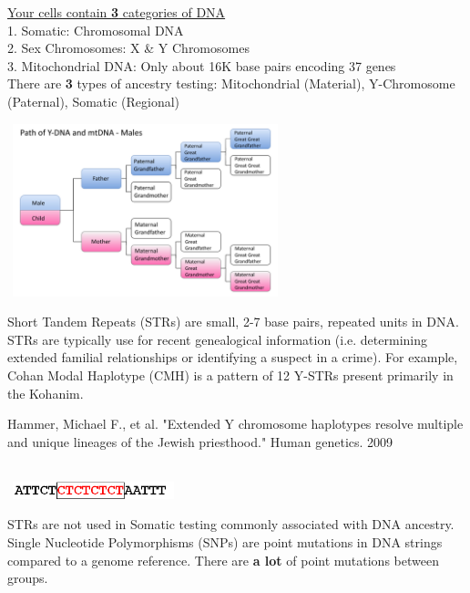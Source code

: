 \documentclass[hyperref,openany, oneside]{labbook} %
\begin{document}
\vspace{-0.4cm}

\vspace{-0.3cm}
\underline{Your cells contain \textbf{3} categories of DNA} \\
1. Somatic: Chromosomal DNA \\
2. Sex Chromosomes: X \& Y Chromosomes \\
3. Mitochondrial DNA: Only about 16K base pairs encoding 37 genes \\


There are \textbf{3} types of ancestry testing: Mitochondrial (Material), Y-Chromosome (Paternal), Somatic (Regional)
\begin{center}
	\includegraphics[height=5cm, width=8cm]{Paths.png}
\end{center}

Short Tandem Repeats (STRs) are small, 2-7 base pairs, repeated units in DNA. STRs are typically use for recent genealogical information (i.e. determining extended familial relationships or identifying a suspect in a crime). For example, Cohan Modal Haplotype (CMH) is a pattern of 12 Y-STRs present primarily in the Kohanim.
\vspace{-0.3cm}
\begin{center}
	\begin{tiny}
		Hammer, Michael F., et al. "Extended Y chromosome haplotypes resolve multiple and unique lineages of the Jewish priesthood." Human genetics. 2009
	\end{tiny}\\
	\includegraphics[height=0.5cm, width=5cm]{str-example.png}
\end{center}

STRs are not used in Somatic testing commonly associated with DNA ancestry. Single Nucleotide Polymorphisms (SNPs) are point mutations in DNA strings compared to a genome reference. There are \textbf{a lot} of point mutations between groups. 
\end{document}
